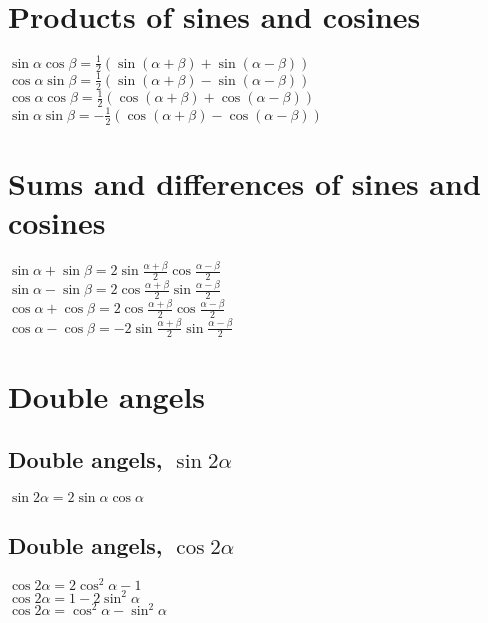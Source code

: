 \documentclass[a4paper, 10pt]{scrartcl}
\begin{document}
\section{Products of sines and cosines}
$\sin{\alpha}\cos{\beta} = \frac{1}{2}(\sin{(\alpha + \beta)} + \sin{(\alpha - \beta)})$\\
$\cos{\alpha}\sin{\beta} = \frac{1}{2}(\sin{(\alpha + \beta)} - \sin{(\alpha - \beta)})$\\
$\cos{\alpha}\cos{\beta} = \frac{1}{2}(\cos{(\alpha + \beta)} + \cos{(\alpha - \beta)})$\\
$\sin{\alpha}\sin{\beta} = -\frac{1}{2}(\cos{(\alpha + \beta)} - \cos{(\alpha - \beta)})$\\

\section{Sums and differences of sines and cosines}
$\sin{\alpha} + \sin{\beta} = 2\sin{\frac{\alpha + \beta}{2}}\cos{\frac{\alpha - \beta}{2}}$\\
$\sin{\alpha} - \sin{\beta} = 2\cos{\frac{\alpha + \beta}{2}}\sin{\frac{\alpha - \beta}{2}}$\\
$\cos{\alpha} + \cos{\beta} = 2\cos{\frac{\alpha + \beta}{2}}\cos{\frac{\alpha - \beta}{2}}$\\
$\cos{\alpha} - \cos{\beta} = -2\sin{\frac{\alpha + \beta}{2}}\sin{\frac{\alpha - \beta}{2}}$\\

\section{Double angels}

\subsection{Double angels, $\sin{2\alpha}$}
$\sin{2\alpha} = 2\sin{\alpha}\cos{\alpha}$\\

\subsection{Double angels, $\cos{2\alpha}$}
$\cos{2\alpha} = 2\cos^{2}{\alpha} - 1$\\
$\cos{2\alpha} = 1 - 2\sin^{2}{\alpha}$\\
$\cos{2\alpha} = \cos^{2}{\alpha} - \sin^{2}{\alpha}$\\
\end{document}
